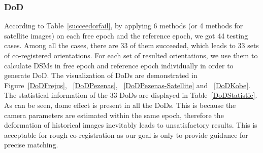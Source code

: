 %
%		
%		



\subsubsection{DoD}
According to Table~\ref{succeedorfail}, by applying 6 methods (or 4 methods for satellite images) on each free epoch and the reference epoch, we got 44 testing cases. Among all the cases, there are 33 of them succeeded, which leads to 33 sets of co-registered orientations. For each set of resulted orientations, we use them to calculate DSMs in free epoch and reference epoch individually in order to generate DoD. 
The visualization of DoDs are demonstrated in Figure~\ref{DoDFrejus}, ~\ref{DoDPezenas}, ~\ref{DoDPezenas-Satellite} and ~\ref{DoDKobe}.
The statistical information of the 33 DoDs are displayed in Table~\ref{DoDStatistic}.\\
As can be seen, dome effect is present in all the DoDs. This is because the camera parameters are estimated within the same epoch, therefore the deformation of historical images inevitably leads to unsatisfactory results. This is acceptable for rough co-registration as our goal is only to provide guidance for precise matching.

